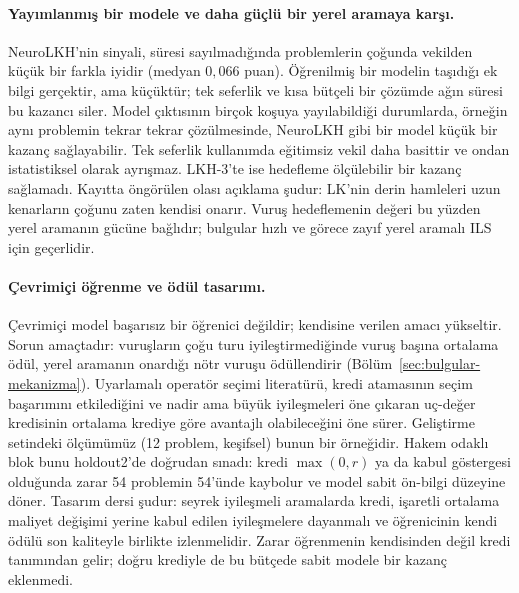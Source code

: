 \paragraph{Yayımlanmış bir modele ve daha güçlü bir yerel aramaya karşı.}
NeuroLKH'nin sinyali, süresi sayılmadığında problemlerin çoğunda vekilden küçük bir farkla iyidir
(medyan $0{,}066$ puan). Öğrenilmiş bir modelin taşıdığı ek bilgi gerçektir, ama küçüktür; tek
seferlik ve kısa bütçeli bir çözümde ağın süresi bu kazancı siler. Model çıktısının birçok koşuya
yayılabildiği durumlarda, örneğin aynı problemin tekrar tekrar çözülmesinde, NeuroLKH gibi bir
model küçük bir kazanç sağlayabilir. Tek seferlik kullanımda eğitimsiz vekil daha basittir ve
ondan istatistiksel olarak ayrışmaz.
LKH-3'te ise hedefleme ölçülebilir bir kazanç sağlamadı. Kayıtta öngörülen olası açıklama şudur:
LK'nin derin hamleleri uzun kenarların çoğunu zaten kendisi onarır. Vuruş hedeflemenin değeri bu
yüzden yerel aramanın gücüne bağlıdır; bulgular hızlı ve görece zayıf yerel aramalı ILS için
geçerlidir.

\paragraph{Çevrimiçi öğrenme ve ödül tasarımı.}
Çevrimiçi model başarısız bir öğrenici değildir; kendisine verilen amacı yükseltir. Sorun amaçtadır:
vuruşların çoğu turu iyileştirmediğinde vuruş başına ortalama ödül, yerel aramanın onardığı nötr
vuruşu ödüllendirir (Bölüm~\ref{sec:bulgular-mekanizma}). Uyarlamalı operatör seçimi literatürü, kredi atamasının seçim başarımını etkilediğini \citep{fialho_2010_aos} ve nadir ama büyük iyileşmeleri öne çıkaran uç-değer kredisinin ortalama krediye göre avantajlı olabileceğini \citep{fialho_2008_extreme} öne sürer. Geliştirme setindeki ölçümümüz (12 problem, keşifsel) bunun bir örneğidir. Hakem odaklı blok bunu
holdout2'de doğrudan sınadı: kredi $\max(0,r)$ ya da kabul göstergesi olduğunda zarar 54 problemin
54'ünde kaybolur ve model sabit ön-bilgi düzeyine döner. Tasarım dersi şudur: seyrek iyileşmeli
aramalarda kredi, işaretli ortalama maliyet değişimi yerine kabul edilen iyileşmelere dayanmalı ve
öğrenicinin kendi ödülü son kaliteyle birlikte izlenmelidir. Zarar öğrenmenin kendisinden değil
kredi tanımından gelir; doğru krediyle de bu bütçede sabit modele bir kazanç eklenmedi.

